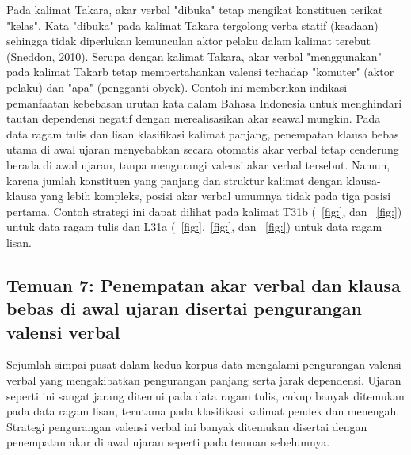 Pada kalimat Takara, akar verbal "dibuka" tetap mengikat konstituen terikat "kelas". Kata "dibuka" pada kalimat Takara tergolong verba statif (keadaan) sehingga tidak diperlukan kemunculan aktor pelaku dalam kalimat terebut (Sneddon, 2010). Serupa dengan kalimat Takara, akar verbal "menggunakan" pada kalimat Takarb tetap mempertahankan valensi terhadap "komuter" (aktor pelaku) dan "apa" (pengganti obyek). Contoh ini memberikan indikasi pemanfaatan kebebasan urutan kata dalam Bahasa Indonesia untuk menghindari tautan dependensi negatif dengan merealisasikan akar seawal mungkin. Pada data ragam tulis dan lisan klasifikasi kalimat panjang, penempatan klausa bebas utama di awal ujaran menyebabkan secara otomatis akar verbal tetap cenderung berada di awal ujaran, tanpa mengurangi valensi akar verbal tersebut. Namun, karena jumlah konstituen yang panjang dan struktur kalimat dengan klausa-klausa yang lebih kompleks, posisi akar verbal umumnya tidak pada tiga posisi pertama. Contoh strategi ini dapat dilihat pada kalimat T31b (\pic~\ref{fig:}, dan \pic~\ref{fig:}) untuk data ragam tulis dan L31a (\pic~\ref{fig:},\pic~\ref{fig:}, dan \pic~\ref{fig:}) untuk data ragam lisan.

\subsection{Temuan 7: Penempatan akar verbal dan klausa bebas di awal ujaran disertai pengurangan valensi verbal}
Sejumlah simpai pusat dalam kedua korpus data mengalami pengurangan valensi verbal yang mengakibatkan pengurangan panjang serta jarak dependensi. Ujaran seperti ini sangat jarang ditemui pada data ragam tulis, cukup banyak ditemukan pada data ragam lisan, terutama pada klasifikasi kalimat pendek dan menengah. Strategi pengurangan valensi verbal ini banyak ditemukan disertai dengan penempatan akar di awal ujaran seperti pada temuan sebelumnya. 

